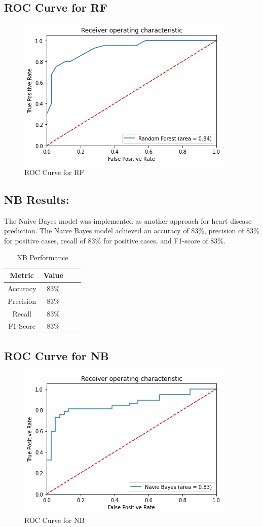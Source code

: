 \subsection{ROC Curve for RF}

\begin{figure}[H]
    \centering
    \includegraphics[width=0.5\linewidth]{RF.png}
    \caption{ROC Curve for RF}
    \label{RF}
\end{figure}

\subsection{NB Results:}
The Naive Bayes model was implemented as another approach for heart disease prediction. The Naive Bayes model achieved an accuracy of 83\%, precision of 83\% for positive cases, recall of 83\% for positive cases, and F1-score of 83\%.


\begin{table}[h!]
    \centering
    \caption{NB Performance}
    \label{tab:_ex_tab}
    \begin{tabular}{cccc}     
        \toprule
             Metric  & Value\\
        \midrule
            Accuracy  & 83\% \\
           Precision & 83\% \\
           Recall  & 83\% \\
           F1-Score & 83\% \\ 
        \bottomrule
    \end{tabular}
\end{table}

\subsection{ROC Curve for NB}

\begin{figure}[H]
    \centering
    \includegraphics[width=0.5\linewidth]{NB.png}
    \caption{ROC Curve for NB}
    \label{NB}
\end{figure}

